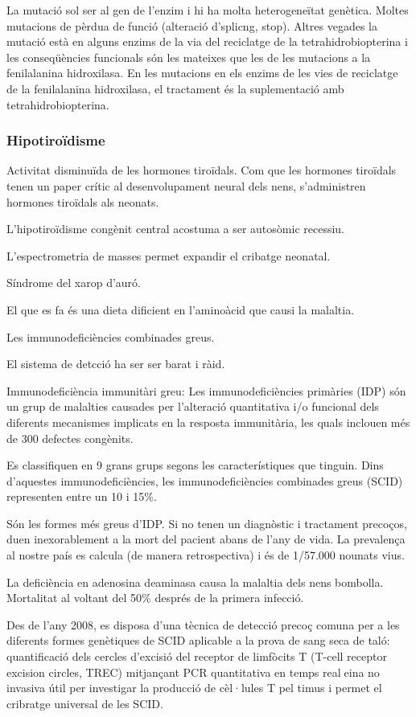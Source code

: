 La mutació sol ser al gen de l'enzim i hi ha molta heterogeneïtat genètica. Moltes mutacions de pèrdua de funció (alteració d'splicng, stop). Altres vegades la mutació està en alguns enzims de la via del reciclatge de la tetrahidrobiopterina i les conseqüències funcionals són les mateixes que les de les mutacions a la fenilalanina hidroxilasa. En les mutacions en els enzims de les vies de reciclatge de la fenilalanina hidroxilasa, el tractament és la suplementació amb tetrahidrobiopterina.

\subsubsection{Hipotiroïdisme}
Activitat disminuïda de les hormones tiroïdals. Com que les hormones tiroïdals tenen un paper crític al desenvolupament neural dels nens, s'administren hormones tiroïdals als neonats.

L'hipotiroïdisme congènit central acostuma a ser autosòmic recessiu.

L'espectrometria de masses permet expandir el cribatge neonatal.

Síndrome del xarop d'auró.

El que es fa és una dieta dificient en l'aminoàcid que causi la malaltia.

Les immunodeficiències combinades greus.

El sistema de detcció ha ser ser barat i ràid.

Immunodeficiència immunitàri greu:
Les immunodeficiències primàries (IDP) són un grup de malalties causades per l’alteració quantitativa i/o funcional dels diferents mecanismes implicats en la resposta immunitària, les quals inclouen més de 300 defectes congènits.

Es classifiquen en 9 grans grups segons les característiques que tinguin. Dins d’aquestes immunodeficiències, les immunodeficiències combinades greus (SCID) representen entre un 10 i 15\%.

Són les formes més greus d’IDP. Si no tenen un diagnòstic i tractament precoços, duen inexorablement a la mort del pacient abans de l’any de vida. La prevalença al nostre país es calcula (de manera retrospectiva) i és de 1/57.000 nounats vius.

La deficiència en adenosina deaminasa causa la malaltia dels nens bombolla. Mortalitat al voltant del 50\% després de la primera infecció.

Des de l’any 2008, es disposa d’una tècnica de detecció precoç comuna per a les diferents formes genètiques de SCID aplicable a la prova de sang seca de taló: quantificació dels cercles d’excisió del receptor de limfòcits T (T-cell receptor excision circles, TREC) mitjançant PCR quantitativa en temps realeina no invasiva útil per investigar la producció de cèl·lules T pel timus i permet el cribratge universal de les SCID.

